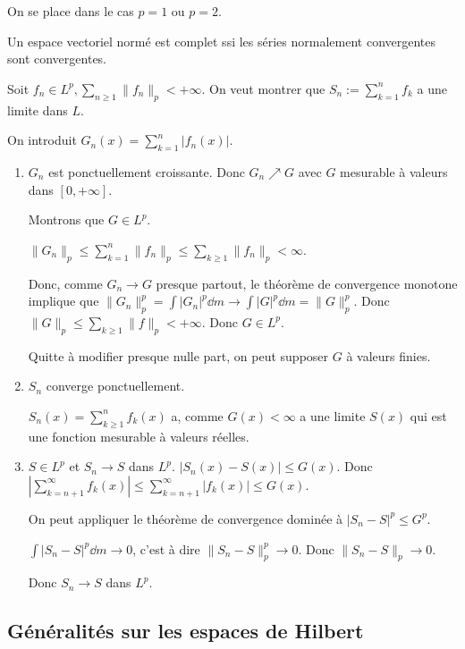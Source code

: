 \documentclass[10pt,a4paper,notitlepage ]{report}
\begin{document}
\begin{demo}
	On se place dans le cas $p=1$ ou $p=2$.
	
	Un espace vectoriel normé est complet ssi les séries normalement convergentes sont convergentes.
	
	Soit $f_n\in L^p, \sum_{n\ge 1}\|f_n\|_p < +\infty$. On veut montrer que $S_n := \sum_{k=1}^n f_k$ a une limite dans $L$.
	
	On introduit $G_n(x) = \sum_{k=1}^n |f_n(x)|$.
	
	\begin{enumerate}
		\item $G_n$ est ponctuellement croissante. Donc $G_n \nearrow G$ avec $G$ mesurable à valeurs dans $[0,+\infty]$.
		
		Montrons que $G\in L^p$.
		
		$\|G_n\|_p \le \sum_{k=1}^n \|f_n\|_p \le \sum_{k\ge 1} \|f_n\|_p < \infty$.
		
		Donc, comme $G_n \rightarrow G$ presque partout, le théorème de convergence monotone implique que $\|G_n\|_p^p = \int |G_n|^p \dd m \rightarrow \int |G|^p \dd m = \|G\|_p^p$. Donc $\|G\|_p \le \sum_{k\ge 1} \|f\|_p < + \infty$. Donc $G \in L^p$.
		
		Quitte à modifier presque nulle part, on peut supposer $G$ à valeurs finies.
		
		\item $S_n$ converge ponctuellement.
		
		$S_n(x) = \sum_{k\ge 1}^n f_k(x)$ a, comme $G(x) < \infty$ a une limite $S(x)$ qui est une fonction mesurable à valeurs réelles.
		
		\item $S\in L^p$ et $S_n \rightarrow S$ dans $L^p$.
		$|S_n(x)-S(x)| \le G(x)$. Donc $|\sum_{k=n+1}^\infty f_k(x)| \le \sum_{k=n+1}^\infty |f_k(x)| \le G(x)$.
		
		On peut appliquer le théorème de convergence dominée à $|S_n-S|^p \le G^p$.
		
		$\int|S_n-S|^p \dd m \rightarrow 0$, c'est à dire $\|S_n-S\|_p^p \rightarrow 0$. Donc $\|S_n-S\|_p \rightarrow 0$.
		
		Donc $S_n \rightarrow S$ dans $L^p$.
	\end{enumerate}
\end{demo}

\subsection{Généralités sur les espaces de Hilbert}
\end{document}
